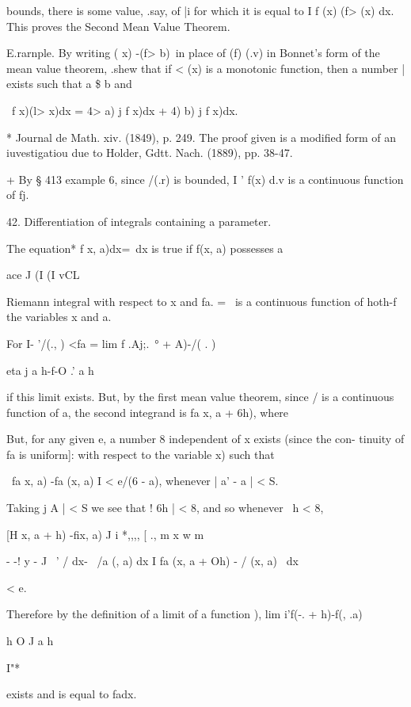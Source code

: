 bounds, there is some value, .say, of |i for which it is equal to I f
(x) (f> (x) dx. This proves the Second Mean Value Theorem.

E.rarnple. By writing ( x) -(f> b)\ in place of (f) (.v) in Bonnet's
form of the mean value theorem, .shew that if < (x) is a monotonic
function, then a number | exists such that a \$ b and

\ f x)(l> x)dx = 4> a) j f x)dx + 4) b) j f x)dx.


* Journal de Math. xiv. (1849), p. 249. The proof given is a modified
form of an iuvestigatiou due to Holder, Gdtt. Nach. (1889), pp. 38-47.

+ By § 413 example 6, since /(.r) is bounded, I ' f(x) d.v is a
continuous function of fj.

%
%

42. Differentiation of integrals containing a parameter.

The equation* f x, a)dx=\ dx is true if f(x, a) possesses a

ace J (I (I vCL

Riemann integral with respect to x and fa. = \ is a continuous
function of hoth-f the variables x and a.

For I- '/(., ) <fa = lim f .Aj;.\ ° + A)-/( . )

eta j a h-f-O .' a h

if this limit exists. But, by the first mean value theorem, since / is
a continuous function of a, the second integrand is fa x, a + 6h),
where

But, for any given e, a number 8 independent of x exists (since the
con- tinuity of fa is uniform]: with respect to the variable x) such
that

\ fa x, a) -fa (x, a) I < e/(6 - a), whenever | a' - a | < S.

Taking j A | < S we see that ! 6h | < 8, and so whenever \ h < 8,

[H x, a + h) -fix, a) J i *,,,, [ ., m x w m

 - -! y - J \ ' / dx- \ /a (, a) dx I fa (x, a + Oh) - / (x, a) \ dx

< e.

Therefore by the definition of a limit of a function ), lim
i'f(-. + h)-f(, .a)

h O J a h

I"*

exists and is equal to fadx.

